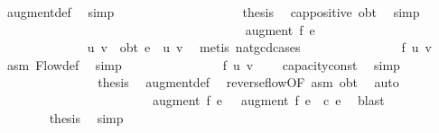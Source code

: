 {\ augment{\isacharunderscore}def\ \isamarkupfalse%
\ simp\isanewline
\ \ \ \ \ \ \ \ \ \ \ \ \ \ \ \ \ \ \isamarkupfalse%
\ {\isacharquery}thesis\ \isamarkupfalse%
\ cap{\isacharunderscore}positive\ obt\ \isamarkupfalse%
\ simp\isanewline
\ \ \ \ \ \ \ \ \ \ \ \ \ \ \isamarkupfalse%
\isanewline
\ \ \ \ \ \ \ \ \ \ \isamarkupfalse%
\isanewline
\ \ \ \ \ \ \ \ \isamarkupfalse%
\ \isamarkupfalse%
\ {\isachardoublequoteopen}{}\ {\isasymle}\ augment\ f{\isacharprime}\ e{\isachardoublequoteclose}\isanewline
\ \ \ \ \ \ \ \ \ \ \isamarkupfalse%
\ {\isacharminus}\isanewline
\ \ \ \ \ \ \ \ \ \ \ \ \isamarkupfalse%
\ u\ v\ \ obt{\isacharcolon}\ {\isachardoublequoteopen}e\ {\isacharequal}\ {\isacharparenleft}u{\isacharcomma}\ v{\isacharparenright}{\isachardoublequoteclose}\ \isamarkupfalse%
\ {\isacharparenleft}metis\ nat{\isacharunderscore}gcd{\isachardot}cases{\isacharparenright}\isanewline
\ \ \ \ \ \ \ \ \ \ \ \ \isamarkupfalse%
\ \isamarkupfalse%
\ {\isachardoublequoteopen}f{\isacharprime}\ {\isacharparenleft}u{\isacharcomma}\ v{\isacharparenright}\ {\isasymge}\ {}{\isachardoublequoteclose}\ \isamarkupfalse%
\ asm\ Flow{\isacharunderscore}def\ \isamarkupfalse%
\ simp\isanewline
\ \ \ \ \ \ \ \ \ \ \ \ \isamarkupfalse%
\ \isamarkupfalse%
\ {\isachardoublequoteopen}f\ {\isacharparenleft}u{\isacharcomma}\ v{\isacharparenright}\ {\isasymge}\ {}{\isachardoublequoteclose}\ \isamarkupfalse%
\ capacity{\isacharunderscore}const\ \isamarkupfalse%
\ simp\isanewline
\ \ \ \ \ \ \ \ \ \ \ \ \isamarkupfalse%
\ \isamarkupfalse%
\ {\isacharquery}thesis\ \isamarkupfalse%
\ augment{\isacharunderscore}def\ \isamarkupfalse%
\ reverse{\isacharunderscore}flow{\isacharbrackleft}OF\ asm{\isacharbrackright}\ obt\ \isamarkupfalse%
\ auto\isanewline
\ \ \ \ \ \ \ \ \ \ \isamarkupfalse%
\isanewline
\ \ \ \ \ \ \ \ \isamarkupfalse%
\ \isamarkupfalse%
\ {\isachardoublequoteopen}{}\ {\isasymle}\ {\isacharparenleft}augment\ f{\isacharprime}{\isacharparenright}\ e\ {\isasymand}\ \ {\isacharparenleft}augment\ f{\isacharprime}{\isacharparenright}\ e\ {\isasymle}\ c\ e{\isachardoublequoteclose}\ \isamarkupfalse%
\ blast\ \ \ \isanewline
\ \ \ \ \ \ \isacommand{{\isacharbraceright}}\isamarkupfalse%
\isanewline
\ \ \ \ \ \ \isamarkupfalse%
\ {\isacharquery}thesis\ \isamarkupfalse%
\ simp\isanewline
\ \ \ \ \isamarkupfalse%
%
%
%
{}\isamarkupfalse%
%
}%
